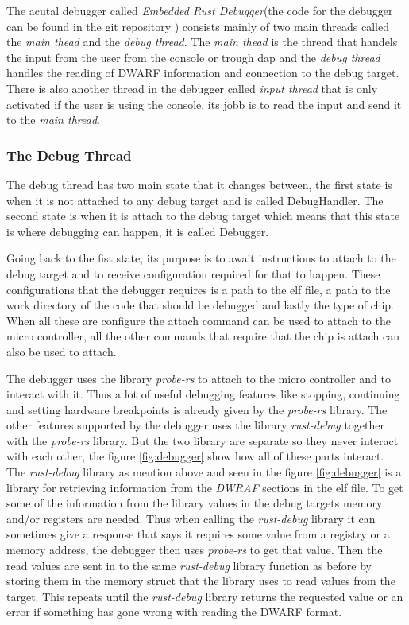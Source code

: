 The acutal debugger called \emph{Embedded Rust Debugger}(the code for the debugger can be found in the git repository \cite{erd}) consists mainly of two main threads called the \emph{main thead} and the \emph{debug thread}.
The \emph{main thead} is the thread that handels the input from the user from the console or trough \gls{dap} and the \emph{debug thread} handles the reading of \gls{DWARF} information and connection to the debug target.
There is also another thread in the debugger called \emph{input thread} that is only activated if the user is using the console, its jobb is to read the input and send it to the \emph{main thread}.


\subsubsection{The Debug Thread}
The debug thread has two main state that it changes between, the first state is when it is not attached to any debug target and is called DebugHandler.
The second state is when it is attach to the debug target which means that this state is where debugging can happen, it is called Debugger.


Going back to the fist state, its purpose is to await instructions to attach to the debug target and to receive configuration required for that to happen.
These configurations that the debugger requires is a path to the elf file, a path to the work directory of the code that should be debugged and lastly the type of chip.
When all these are configure the attach command can be used to attach to the micro controller, all the other commands that require that the chip is attach can also be used to attach.


The debugger uses the library \emph{probe-rs} \cite{probe} to attach to the micro controller and to interact with it.
Thus a lot of useful debugging features like stopping, continuing and setting hardware breakpoints is already given by the \emph{probe-rs} library.
The other features supported by the debugger uses the library \emph{rust-debug} together with the \emph{probe-rs} library.
But the two library are separate so they never interact with each other, the figure \ref{fig:debugger} show how all of these parts interact.
The \emph{rust-debug} library as mention above and seen in the figure \ref{fig:debugger} is a library for retrieving information from the \emph{DWRAF} sections in the \gls{elf} file.
To get some of the information from the library values in the debug targets memory and/or registers are needed.
Thus when calling the \emph{rust-debug} library it can sometimes give a response that says it requires some value from a registry or a memory address, the debugger then uses \emph{probe-rs} to get that value.
Then the read values are sent in to the same \emph{rust-debug} library function as before by storing them in the memory struct that the library uses to read values from the target.
This repeats until the \emph{rust-debug} library returns the requested value or an error if something has gone wrong with reading the \gls{DWARF} format.


